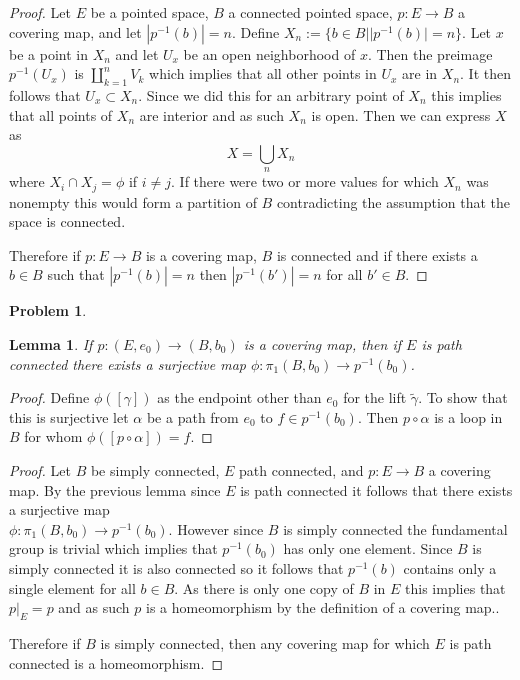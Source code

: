 \documentclass[10pt]{article}
\newcommand{\sk}{\vskip 10mm}
\theoremstyle{plain}
\newtheorem{problem}{Problem}
\newtheorem{lemma}{Lemma}[problem]
\theoremstyle{remark}
\begin{document}
\begin{proof}
  Let $E$ be a pointed space, $B$ a connected pointed space, $p:E\rightarrow B$ a covering map,
  and let $|p^{-1}(b)|=n$.
  Define $X_n:=\{b\in B||p^{-1}(b)|=n\}$. Let $x$ be a point in $X_n$ and let $U_x$ be
  an open neighborhood of $x$. Then the preimage $p^{-1}(U_x)$ is $\coprod_{k=1}^nV_k$
  which implies that all other points in $U_x$ are in $X_n$. It then follows that
  $U_x\subset X_n$. Since we did this for an arbitrary point of $X_n$ this implies that
  all points of $X_n$ are interior and as such $X_n$ is open. Then we can express
  $X$ as
  \[ X=\bigcup_nX_n\] where $X_i\cap X_j=\phi$ if $i\neq j$. If there were two or more values for
  which $X_n$ was nonempty this would form a partition of $B$ contradicting the assumption
  that the space is connected.

  Therefore if $p:E\rightarrow B$ is a covering map, $B$ is connected and if there exists
  a $b\in B$ such that $|p^{-1}(b)|=n$ then $|p^{-1}(b')|=n$ for all $b'\in B$.
\end{proof}

\sk

\begin{problem} %
  
\end{problem}

\begin{lemma}
  If $p:(E,e_0)\rightarrow (B,b_0)$ is a covering map, then if $E$ is path connected
  there exists a surjective map $\phi:\pi_1(B,b_0)\rightarrow p^{-1}(b_0)$.
\end{lemma}

\begin{proof}
  Define $\phi([\gamma])$ as the endpoint other than $e_0$ for the lift $\tilde{\gamma}$.
  To show that this is surjective let $\alpha$ be a path from $e_0$ to $f\in p^{-1}(b_0)$.
  Then $p\circ\alpha$ is a loop in $B$ for whom $\phi([p\circ\alpha])=f$.
\end{proof}

\begin{proof}
  Let $B$ be simply connected, $E$ path connected, and $p:E\rightarrow B$ a covering map.
  By the previous lemma since $E$ is path connected it follows that there exists a
  surjective map \\$\phi:\pi_1(B,b_0)\rightarrow p^{-1}(b_0)$. However since $B$ is simply connected
  the fundamental group is trivial which implies that $p^{-1}(b_0)$ has only one
  element. Since $B$ is simply connected it is also connected so it follows that
  $p^{-1}(b)$ contains only a single element for all $b\in B$. As there is only one
  copy of $B$ in $E$ this implies that $p|_E=p$ and as such $p$ is a homeomorphism
  by the definition of a covering map..

  Therefore if $B$ is simply connected, then any covering map for which $E$ is
  path connected is a homeomorphism.
\end{proof}
\end{document}
